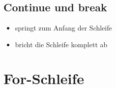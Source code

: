 \livecoding

\subsection{Continue und break}
\begin{frame}
    \slidehead

    \begin{itemize}
        \item {} springt zum Anfang der Schleife
        \item {} bricht die Schleife komplett ab
    \end{itemize}
\end{frame}

\livecoding


\section{For-Schleife}
\subtitle{Kapitel 4: Befehle wiederholen}



